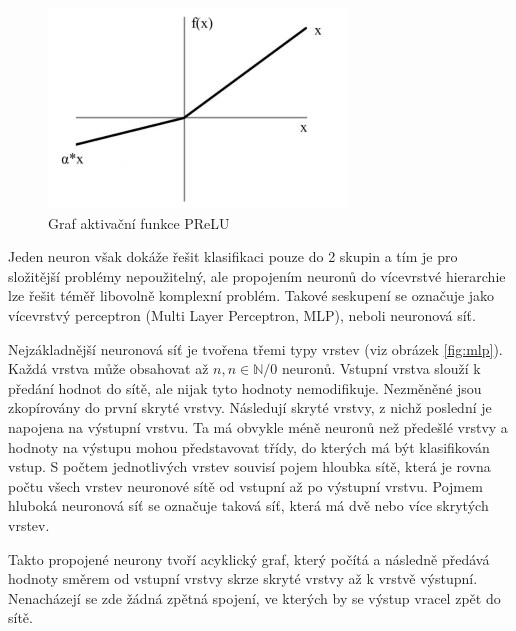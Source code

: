 \begin{figure}[H]
    \centering
    \includegraphics[scale=1.2]{obrazky-figures/prelu.jpg}
    \caption{\label{fig:prelu}Graf aktivační funkce PReLU}
\end{figure}

Jeden neuron však dokáže řešit klasifikaci pouze do 2 skupin a tím je pro složitější problémy nepoužitelný, ale propojením neuronů do vícevrstvé hierarchie lze řešit téměř libovolně komplexní problém. Takové seskupení se označuje jako vícevrstvý perceptron (Multi Layer Perceptron, MLP), neboli neuronová síť.

Nejzákladnější neuronová síť je tvořena třemi typy vrstev (viz obrázek \ref{fig:mlp}). Každá vrstva může obsahovat až $n, n \in \mathbb{N}/{0}$ neuronů. Vstupní vrstva slouží k předání hodnot do sítě, ale nijak tyto hodnoty nemodifikuje. Nezměněné jsou zkopírovány do první skryté vrstvy. Následují skryté vrstvy, z nichž poslední je napojena na výstupní vrstvu. Ta má obvykle méně neuronů než předešlé vrstvy a hodnoty na výstupu mohou představovat třídy, do kterých má být klasifikován vstup. S počtem jednotlivých vrstev souvisí pojem hloubka sítě, která je rovna počtu všech vrstev neuronové sítě od vstupní až po výstupní vrstvu. Pojmem hluboká neuronová síť se označuje taková síť, která má dvě nebo více skrytých vrstev.

Takto propojené neurony tvoří acyklický graf, který počítá a následně předává hodnoty směrem od vstupní vrstvy skrze skryté vrstvy až k vrstvě výstupní. Nenacházejí se zde žádná zpětná spojení, ve kterých by se výstup vracel zpět do sítě.\cite{mitdeeplearning}

